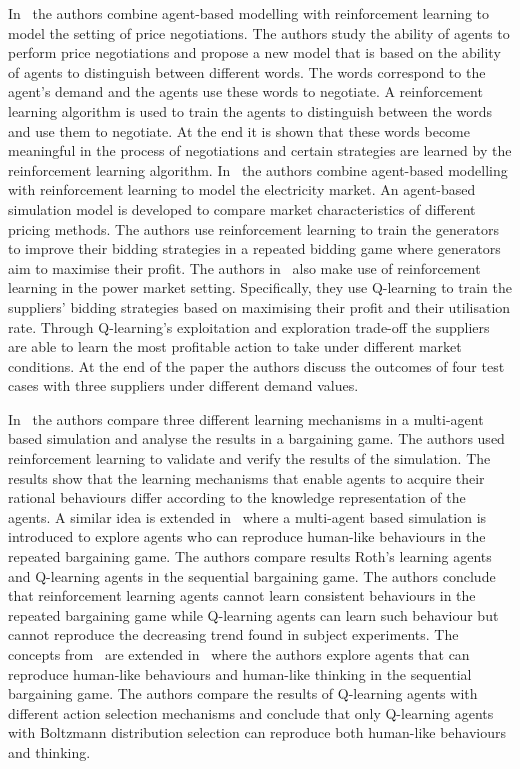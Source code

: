 In~\cite{Iizuka20001075} the authors combine agent-based modelling with
reinforcement learning to model the setting of price negotiations.
The authors study the ability of agents to perform price negotiations and
propose a new model that is based on the ability of agents to distinguish
between different words.
The words correspond to the agent's demand and the agents use these words to
negotiate.
A reinforcement learning algorithm is used to train the agents to distinguish
between the words and use them to negotiate.
At the end it is shown that these words become meaningful in the process of
negotiations and certain strategies are learned by the reinforcement learning
algorithm.
In~\cite{Zou20047} the authors combine agent-based modelling with reinforcement
learning to model the electricity market.
An agent-based simulation model is developed to compare market characteristics
of different pricing methods.
The authors use reinforcement learning to train the generators to improve their
bidding strategies in a repeated bidding game where generators aim to maximise
their profit.
The authors in~\cite{Tellidou2006228} also make use of reinforcement learning
in the power market setting.
Specifically, they use Q-learning to train the suppliers' bidding strategies
based on maximising their profit and their utilisation rate.
Through Q-learning's exploitation and exploration trade-off the suppliers are
able to learn the most profitable action to take under different market
conditions.
At the end of the paper the authors discuss the outcomes of four test cases
with three suppliers under different demand values.

In~\cite{Takadama200326} the authors compare three different learning mechanisms
in a multi-agent based simulation and analyse the results in a bargaining game.
The authors used reinforcement learning to validate and verify the results of
the simulation.
The results show that the learning mechanisms that enable agents to acquire
their rational behaviours differ according to the knowledge representation of
the agents.
A similar idea is extended in~\cite{Takadama2007156} where a multi-agent based
simulation is introduced to explore agents who can reproduce human-like
behaviours in the repeated bargaining game.
The authors compare results Roth's learning agents and Q-learning agents in the
sequential bargaining game.
The authors conclude that reinforcement learning agents cannot learn consistent
behaviours in the repeated bargaining game while Q-learning agents can learn
such behaviour but cannot reproduce the decreasing trend found in subject
experiments.
The concepts from~\cite{Takadama200326,Takadama2007156} are extended
in~\cite{Takadama2008} where the authors explore agents that can reproduce
human-like behaviours and human-like thinking in the sequential bargaining
game.
The authors compare the results of Q-learning agents with different action
selection mechanisms and conclude that only Q-learning agents with Boltzmann
distribution selection can reproduce both human-like behaviours and thinking.

